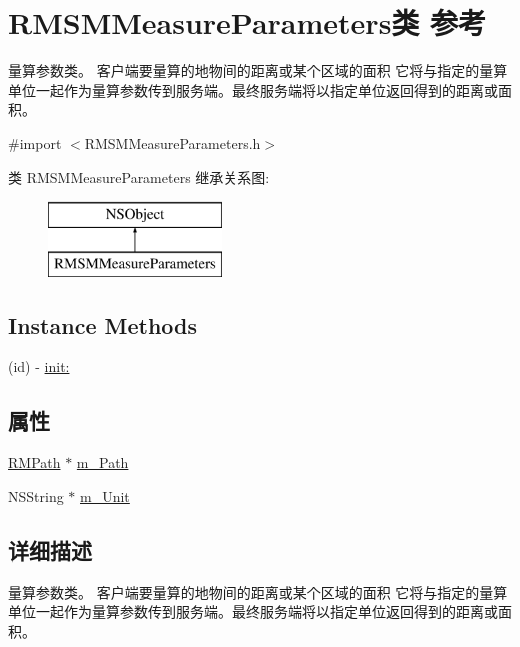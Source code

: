 \hypertarget{interface_r_m_s_m_measure_parameters}{\section{R\-M\-S\-M\-Measure\-Parameters类 参考}
\label{interface_r_m_s_m_measure_parameters}
}


量算参数类。 客户端要量算的地物间的距离或某个区域的面积 它将与指定的量算单位一起作为量算参数传到服务端。最终服务端将以指定单位返回得到的距离或面积。  




{\ttfamily \#import $<$R\-M\-S\-M\-Measure\-Parameters.\-h$>$}

类 R\-M\-S\-M\-Measure\-Parameters 继承关系图\-:\begin{figure}[H]
\begin{center}
\leavevmode
\includegraphics[height=2.000000cm]{interface_r_m_s_m_measure_parameters}
\end{center}
\end{figure}
\subsection*{Instance Methods}
\begin{DoxyCompactItemize}
\item 
(id) -\/ \hyperlink{interface_r_m_s_m_measure_parameters_af836d7ec5c7eb3b4429bf107e209d3a6}{init\-:}
\end{DoxyCompactItemize}
\subsection*{属性}
\begin{DoxyCompactItemize}
\item 
\hyperlink{interface_r_m_path}{R\-M\-Path} $\ast$ \hyperlink{interface_r_m_s_m_measure_parameters_a026a99d51f346037f10a870334cd75f3}{m\-\_\-\-Path}
\item 
N\-S\-String $\ast$ \hyperlink{interface_r_m_s_m_measure_parameters_a82081fa973a7483609242cd0a252f4d1}{m\-\_\-\-Unit}
\end{DoxyCompactItemize}


\subsection{详细描述}
量算参数类。 客户端要量算的地物间的距离或某个区域的面积 它将与指定的量算单位一起作为量算参数传到服务端。最终服务端将以指定单位返回得到的距离或面积。 

